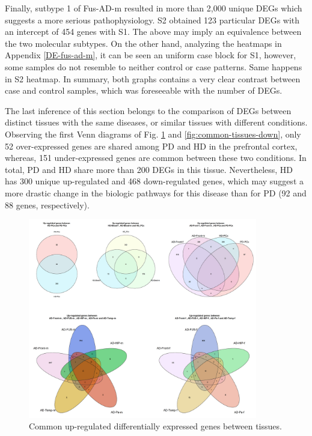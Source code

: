 Finally, sutbype 1 of Fus-AD-m resulted in more than 2,000 unique DEGs which suggests a more serious pathophysiology. S2 obtained 123 particular DEGs with an intercept of 454 genes with S1. The above may imply an equivalence between the two molecular subtypes. On the other hand, analyzing the heatmaps in Appendix \ref{DE-fus-ad-m}, it can be seen an uniform case block for S1, however, some samples do not resemble to neither control or case patterns. Same happens in S2 heatmap. In summary, both graphs contains a very clear contrast between case and control samples, which was foreseeable with the number of DEGs.

The last inference of this section belongs to the comparison of DEGs between distinct tissues with the same diseases, or similar tissues with different conditions. Observing the first Venn diagrams of Fig. \ref{fig:common-tissues-up} and \ref{fig:common-tissues-down}, only 52 over-expressed genes are shared among PD and HD in the prefrontal cortex, whereas, 151 under-expressed genes are common between these two conditions. In total, PD and HD share more than 200 DEGs in this tissue. Nevertheless, HD has 300 unique up-regulated and 468 down-regulated genes, which may suggest a more drastic change in the biologic pathways for this disease than for PD (92 and 88 genes, respectively).

\begin{figure}[!ht]
    \centerline{\includegraphics[width=10cm]{Figures/common-tissue-up-col.jpg}}
    \caption{Common up-regulated differentially expressed genes between tissues.}
\label{fig:common-tissues-up}
\end{figure}
    

